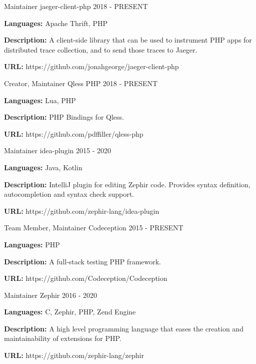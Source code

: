 \begin{cventries}
  \cventry
    {Maintainer}
    {jaeger-client-php}
    {}
    {2018 - PRESENT}
    {
      \begin{cvitems}
        \item {\textbf{Languages:} Apache Thrift, PHP}
        \item {\textbf{Description:} A client-side library that can be used to instrument PHP apps for distributed trace collection, and to send those traces to Jaeger.}
        \item {\textbf{URL:} https://github.com/jonahgeorge/jaeger-client-php}
      \end{cvitems}
    }


    \cventry
    {Creator, Maintainer}
    {Qless PHP}
    {}
    {2018 - PRESENT}
    {
      \begin{cvitems}
        \item {\textbf{Languages:} Lua, PHP}
        \item {\textbf{Description:} PHP Bindings for Qless.}
        \item {\textbf{URL:} https://github.com/pdffiller/qless-php}
      \end{cvitems}
    }

  \cventry
    {Maintainer}
    {idea-plugin}
    {}
    {2015 - 2020}
    {
      \begin{cvitems}
        \item {\textbf{Languages:} Java, Kotlin}
        \item {\textbf{Description:} IntelliJ plugin for editing Zephir code. Provides syntax definition, autocompletion and syntax check support.}
        \item {\textbf{URL:} https://github.com/zephir-lang/idea-plugin}
      \end{cvitems}
    }

  \cventry
    {Team Member, Maintainer}
    {Codeception}
    {}
    {2015 - PRESENT}
    {
      \begin{cvitems}
        \item {\textbf{Languages:} PHP}
        \item {\textbf{Description:} A full-stack testing PHP framework.}
        \item {\textbf{URL:} https://github.com/Codeception/Codeception}
      \end{cvitems}
    }

  \cventry
    {Maintainer}
    {Zephir}
    {}
    {2016 - 2020}
    {
      \begin{cvitems}
        \item {\textbf{Languages:} C, Zephir, PHP, Zend Engine}
        \item {\textbf{Description:} A high level programming language that eases the creation and maintainability of extensions for PHP.}
        \item {\textbf{URL:} https://github.com/zephir-lang/zephir}
      \end{cvitems}
    }


\end{cventries}
